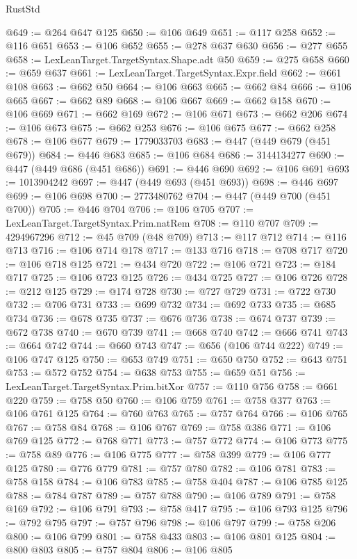 \begin{lexlean}{RustStd}
\begin{coremodule}
@649 := @264 @647 @125
@650 := @106 @649
@651 := @117 @258
@652 := @116 @651
@653 := @106 @652
@655 := @278 @637 @630
@656 := @277 @655
@658 := LexLeanTarget.TargetSyntax.Shape.adt @50
@659 := @275 @658
@660 := @659 @637
@661 := LexLeanTarget.TargetSyntax.Expr.field
@662 := @661 @108
@663 := @662 @50
@664 := @106 @663
@665 := @662 @84
@666 := @106 @665
@667 := @662 @89
@668 := @106 @667
@669 := @662 @158
@670 := @106 @669
@671 := @662 @169
@672 := @106 @671
@673 := @662 @206
@674 := @106 @673
@675 := @662 @253
@676 := @106 @675
@677 := @662 @258
@678 := @106 @677
@679 := 1779033703
@683 := @447 (@449 @679 (@451 @679))
@684 := @446 @683
@685 := @106 @684
@686 := 3144134277
@690 := @447 (@449 @686 (@451 @686))
@691 := @446 @690
@692 := @106 @691
@693 := 1013904242
@697 := @447 (@449 @693 (@451 @693))
@698 := @446 @697
@699 := @106 @698
@700 := 2773480762
@704 := @447 (@449 @700 (@451 @700))
@705 := @446 @704
@706 := @106 @705
@707 := LexLeanTarget.TargetSyntax.Prim.natRem
@708 := @110 @707
@709 := 4294967296
@712 := @45 @709 (@48 @709)
@713 := @117 @712
@714 := @116 @713
@716 := @106 @714 @178
@717 := @133 @716
@718 := @708 @717
@720 := @106 @718 @125
@721 := @434 @720
@722 := @106 @721
@723 := @184 @717
@725 := @106 @723 @125
@726 := @434 @725
@727 := @106 @726
@728 := @212 @125
@729 := @174 @728
@730 := @727 @729
@731 := @722 @730
@732 := @706 @731
@733 := @699 @732
@734 := @692 @733
@735 := @685 @734
@736 := @678 @735
@737 := @676 @736
@738 := @674 @737
@739 := @672 @738
@740 := @670 @739
@741 := @668 @740
@742 := @666 @741
@743 := @664 @742
@744 := @660 @743
@747 := @656 (@106 @744 @222)
@749 := @106 @747 @125
@750 := @653 @749
@751 := @650 @750
@752 := @643 @751
@753 := @572 @752
@754 := @638 @753
@755 := @659 @51
@756 := LexLeanTarget.TargetSyntax.Prim.bitXor
@757 := @110 @756
@758 := @661 @220
@759 := @758 @50
@760 := @106 @759
@761 := @758 @377
@763 := @106 @761 @125
@764 := @760 @763
@765 := @757 @764
@766 := @106 @765
@767 := @758 @84
@768 := @106 @767
@769 := @758 @386
@771 := @106 @769 @125
@772 := @768 @771
@773 := @757 @772
@774 := @106 @773
@775 := @758 @89
@776 := @106 @775
@777 := @758 @399
@779 := @106 @777 @125
@780 := @776 @779
@781 := @757 @780
@782 := @106 @781
@783 := @758 @158
@784 := @106 @783
@785 := @758 @404
@787 := @106 @785 @125
@788 := @784 @787
@789 := @757 @788
@790 := @106 @789
@791 := @758 @169
@792 := @106 @791
@793 := @758 @417
@795 := @106 @793 @125
@796 := @792 @795
@797 := @757 @796
@798 := @106 @797
@799 := @758 @206
@800 := @106 @799
@801 := @758 @433
@803 := @106 @801 @125
@804 := @800 @803
@805 := @757 @804
@806 := @106 @805

\end{coremodule}
\end{lexlean}
